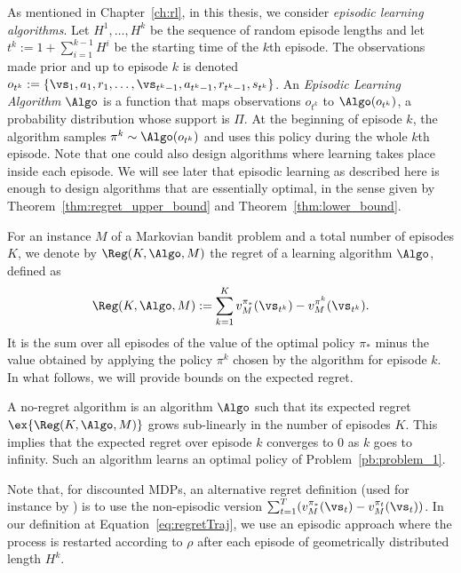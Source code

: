As mentioned in Chapter~\ref{ch:rl}, in this thesis, we consider \emph{episodic learning algorithms}.
Let $H^1,\ldots, H^k$ be the sequence of random episode lengths and let
$t^k:=1{+}\sum_{i=1}^{k-1}H^i$ be the starting time of the $k$th episode.
The observations made prior and up to episode \(k\) is denoted \(o_{t^{k}}:=\{\vs_1,a_1,r_1,\dots,\vs_{t^k-1},a_{t^k-1},r_{t^k-1},s_{t^k}\}\).
An \emph{Episodic Learning
Algorithm} \(\Algo\) is a function that maps observations \(o_{t^k}\) to
\(\Algo(o_{t^k})\), a probability distribution whose support is $\Pi$.  At the
beginning of episode $k$, the algorithm samples \(\pi^k\sim\Algo(o_{t^k})\)
and uses this policy during the whole $k$th episode. Note that one could also
design algorithms where learning takes place inside each episode. We will see
later that episodic learning as described here is enough to design algorithms
that are essentially optimal, in the sense given by Theorem~\ref{thm:regret_upper_bound} and Theorem~\ref{thm:lower_bound}.

For an  instance \(M\) of a Markovian bandit problem and a total number of
episodes $K$, we denote by $\Reg(K,\Algo,M)$ the regret of a
learning algorithm \(\Algo\), defined as
\begin{align}
  \Reg(K,\Algo,M) :=  \sum_{k=1}^K %
      v^{\pi_*}_M(\vs_{t^k}) - v^{\pi^k}_M(\vs_{t^k})%
      .\label{eq:regretTraj}
\end{align}
It is the sum over all episodes of the value of the optimal policy $\pi_*$ minus the value obtained by applying the policy $\pi^k$ chosen by the algorithm for episode $k$. In what follows, we will provide bounds on the expected regret.

A no-regret algorithm is an algorithm $\Algo$ such that its expected regret $\ex{\Reg(K,\Algo,M)}$ grows sub-linearly in the number of episodes $K$. This implies that the expected regret over episode $k$  converges to $0$ as $k$ goes to infinity. Such an algorithm learns an optimal policy of Problem~\ref{pb:problem_1}.

Note that, for discounted MDPs, an alternative regret definition (used for instance by \cite{zhou2021nearly}) is to use the non-episodic version $\sum_{t=1}^T (v^{\pi_*}_M(\vs_{t}) - v^{\pi_t}_M(\vs_{t}))$. In our definition at Equation~\eqref{eq:regretTraj}, we use an episodic approach where the process is restarted according to $\rho$ after each episode of geometrically distributed length $H^k$.

